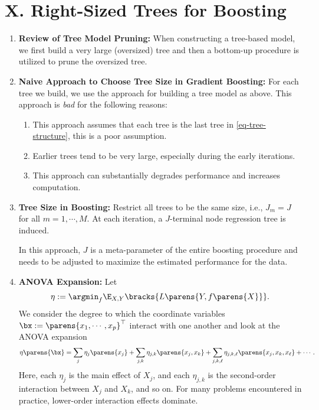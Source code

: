 \documentclass[12pt]{article}
\begin{document}
\begin{enumerate}[label=\textbf{\arabic*.}]
\end{enumerate}


\section*{X. Right-Sized Trees for Boosting}

\begin{enumerate}[label=\textbf{\arabic*.}]

	\item \textbf{Review of Tree Model Pruning:} When constructing a tree-based model, we first build a very large (oversized) tree and then a bottom-up procedure is utilized to prune the oversized tree. 
	
	\item \textbf{Naive Approach to Choose Tree Size in Gradient Boosting:} For each tree we build, we use the approach for building a tree model as above. This approach is \emph{bad} for the following reasons: 
	\begin{enumerate}
		\item This approach assumes that each tree is the last tree in \eqref{eq-tree-structure}, this is a poor assumption. 
		\item Earlier trees tend to be very large, especially during the early iterations. 
		\item This approach can substantially degrades performance and increases computation. 
	\end{enumerate}
	
	\item \textbf{Tree Size in Boosting:} Restrict all trees to be the same size, i.e., $J_m = J$ for all $m = 1, \cdots, M$. At each iteration, a $J$-terminal node regression tree is induced. 
	
	In this approach, $J$ is a meta-parameter of the entire boosting procedure and needs to be adjusted to maximize the estimated performance for the data. 
	
	\item \textbf{ANOVA Expansion:} Let 
	\begin{align*}
		\eta := \argmin_f \E_{X, Y} \bracks{L\parens{Y, f \parens{X}}}. 
	\end{align*}
	We consider the degree to which the coordinate variables $\bx := \parens{x_1, \cdots, x_p}^\top$ interact with one another and look at the ANOVA expansion 
	\begin{align*}
		\eta \parens{\bx} = \sum_{j} \eta_j \parens{x_j} + \sum_{j, k} \eta_{j,k} \parens{x_j, x_k} + \sum_{j,k,\ell} \eta_{j,k,\ell} \parens{x_j, x_k, x_{\ell}} + \cdots. 
	\end{align*}
	Here, each $\eta_j$ is the main effect of $X_j$, and each $\eta_{j,k}$ is the second-order interaction between $X_j$ and $X_k$, and so on. For many problems encountered in practice, lower-order interaction effects dominate. 
	

\end{enumerate}
\end{document}
